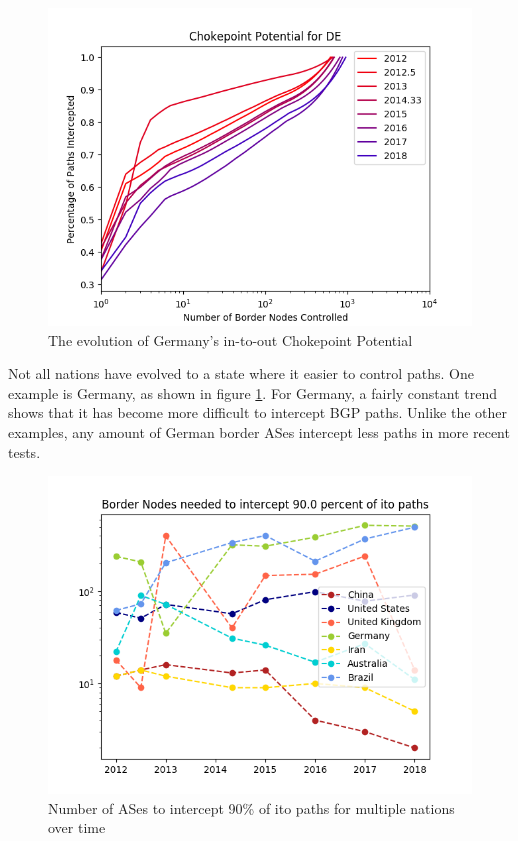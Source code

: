 \documentclass[10pt, conference, letterpaper]{IEEEtran}
\begin{document}
\begin{figure}
	\centering
	\includegraphics[width=\linewidth]{single_DE}
	\caption{The evolution of Germany's in-to-out Chokepoint Potential}\label{fig:GermChokePoint}
\end{figure}

\par
Not all nations have evolved to a state where it easier to control paths. One example is Germany, as shown in figure \ref{fig:GermChokePoint}. For Germany, a fairly constant
trend shows that it has become more difficult to intercept BGP paths. Unlike the other examples, any amount of German border ASes intercept less paths in more recent tests.

\begin{figure}
	\centering
	\includegraphics[width=\linewidth]{NodesNeeded}
	\caption{Number of ASes to intercept 90\% of ito paths for multiple nations over time}\label{fig:nodes}
\end{figure}
\end{document}
